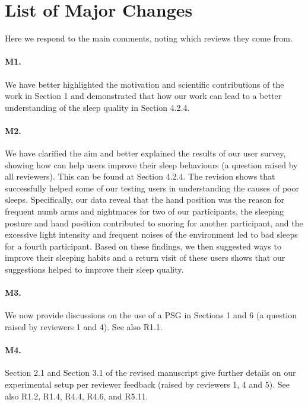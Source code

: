 \section*{List of Major Changes}

Here we respond to the main comments, noting which reviews they come from.

\paragraph{M1.} We have better highlighted the motivation and scientific contributions of the work in Section 1 and demonstrated that how our work can lead to
a better understanding of the sleep quality in Section 4.2.4.

\paragraph{M2.} We have clarified the aim and better explained the results of our user survey, showing how \systemname can help users
improve their sleep behaviours (a question raised by all reviewers). This can be found at Section 4.2.4. The revision shows that
\systemname successfully helped some of our testing users in understanding the causes of poor sleeps. Specifically, our data reveal that
the hand position was the reason for frequent numb arms and nightmares for two of our participants, the sleeping posture and hand position
contributed to snoring for another participant, and the excessive light intensity and frequent noises of the environment led to bad sleeps
for a fourth participant. Based on these findings, we then suggested ways to improve their sleeping habits and a return visit of these
users shows that our suggestions helped to improve their sleep quality.

\paragraph{M3.} We now provide discussions on the use of a PSG in Sections 1 and 6 (a question raised by reviewers 1 and 4). See also R1.1.

\paragraph{M4.} Section 2.1 and Section 3.1 of the revised manuscript give further details on our experimental setup per reviewer feedback (raised by reviewers 1, 4 and 5). See also R1.2, R1.4, R4.4, R4.6, and R5.11.

